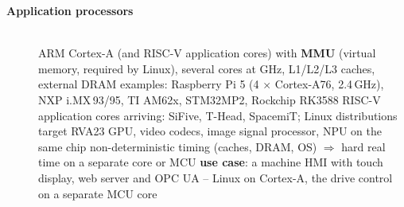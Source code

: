 \begin{description}
\item[{\rot\bf Application processors}]~\\[-\lblskip]
\bi
	\ite ARM Cortex-A (and RISC-V application cores) with \textbf{MMU} (virtual memory, required by Linux), several cores at GHz, L1/L2/L3 caches, external DRAM
	\ite examples: Raspberry Pi 5 (4 $\times$ Cortex-A76, 2.4\,GHz), NXP i.MX\,93/95, TI AM62x, STM32MP2, Rockchip RK3588
	\ite RISC-V application cores arriving: SiFive, T-Head, SpacemiT; Linux distributions target RVA23
	\ite GPU, video codecs, image signal processor, NPU on the same chip
	\ite non-deterministic timing (caches, DRAM, OS) $\Rightarrow$ hard real time on a separate core or MCU
	\ite \textbf{use case}: a machine HMI with touch display, web server and OPC UA -- Linux on Cortex-A, the drive control on a separate MCU core
\ei
\os{\newpage}


\end{description}
